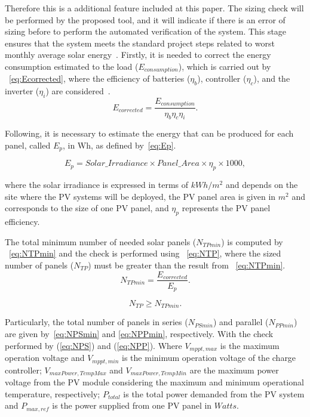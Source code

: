 \documentclass[review]{elsarticle}
\begin{document}
Therefore this is a additional feature included at this paper. The sizing check will be performed by the proposed tool, and it will indicate if there is an error of sizing before to perform the automated verification of the system. This stage ensures that the system meets the standard project steps related to worst monthly average solar energy~\cite{Pinho}. 
%
Firstly, it is needed to correct the energy consumption estimated to the load ($E_{consumption}$), which is carried out by ~\eqref{eq:Ecorrected}, where the efficiency of batteries ($\eta_{b}$), controller ($\eta_{c}$), and the inverter ($\eta_{i}$) are considered~\cite{Pinho}.
\begin{equation}
\label{eq:Ecorrected}
E_{corrected} = \dfrac{E_{consumption}}{ \eta_{b} \eta_{c} \eta_{i} }.
\end{equation}

Following, it is necessary to estimate the energy that can be produced for each panel, called $E_{p}$, in Wh, as defined by~\eqref{eq:Ep}.

\begin{equation}
\label{eq:Ep}
E_{p} = Solar\_Irradiance \times Panel\_Area \times \eta_{p} \times 1000,
\end{equation}

\noindent where the solar irradiance is expressed in terms of $kWh/m^{2}$ and depends on the site where the PV systems will be deployed, the PV panel area is given in $m^{2}$ and corresponds to the size of one PV panel, and $\eta_{p}$ represents the PV panel efficiency.

The total minimum number of needed solar panels ($N_{TPmin}$) is computed by ~\eqref{eq:NTPmin} and the check is performed using ~\eqref{eq:NTP}, where the sized number of panels ($ N_{TP} $) must be greater than the result from ~\eqref{eq:NTPmin}.
\begin{equation}
\label{eq:NTPmin}
N_{TPmin} = \dfrac{E_{corrected}}{E_{p}}.
\end{equation}

\begin{equation}
\label{eq:NTP}
N_{TP} \geq N_{TPmin}.
\end{equation}

Particularly, the total number of panels in series ($N_{PSmin}$) and parallel ($N_{PPmin}$) are given by~\eqref{eq:NPSmin} and \eqref{eq:NPPmin}, respectively. With the check performed by (\ref{eq:NPS}) and (\ref{eq:NPP}). Where $V_{mppt,max}$ is the maximum operation voltage and $V_{mppt,min}$ is the minimum operation voltage of the charge controller; $V_{maxPower,TempMax}$ and $V_{maxPower,TempMin}$ are the maximum power voltage from the PV module considering the maximum and minimum operational temperature, respectively; $P_{total}$ is the total power demanded from the PV system and $P_{max,ref}$ is the power supplied from one PV panel in $Watts$.
\end{document}
